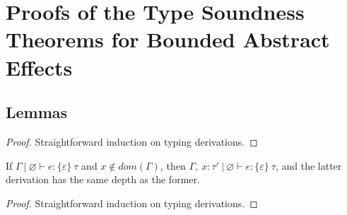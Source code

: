 \chapter{Proofs of the Type Soundness Theorems for Bounded Abstract Effects}
\label{app-effects-type-soundness}

\section{Lemmas}


\begin{proof}
Straightforward induction on typing derivations.
\end{proof}


\begin{lemma}[Weakening]
If $\Gamma~|~\varnothing \vdash e : \{ \varepsilon \}~\tau$ and $x \not\in dom(\Gamma)$, then $\Gamma,~x : \tau'~|~\varnothing \vdash e : \{ \varepsilon \}~\tau$, and the latter derivation has the same depth as the former.
\end{lemma}

\begin{proof}
Straightforward induction on typing derivations.
\end{proof}


